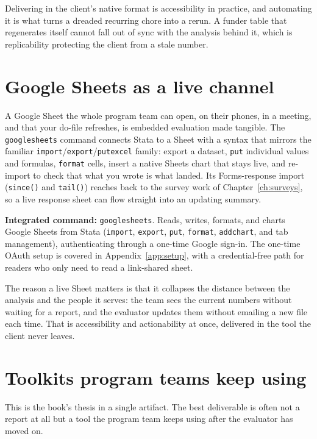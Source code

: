 \documentclass[
    a4paper,
    fontsize=10pt,
    twoside=true,
    numbers=noenddot,
]{kaobook}
\begin{document}
Delivering in the client's native format is accessibility in practice, and automating it is what turns a dreaded recurring chore into a rerun. A funder table that regenerates itself cannot fall out of sync with the analysis behind it, which is replicability protecting the client from a stale number.

\section{Google Sheets as a live channel}
A Google Sheet the whole program team can open, on their phones, in a meeting, and that your do-file refreshes, is embedded evaluation made tangible. The \texttt{googlesheets} command connects Stata to a Sheet with a syntax that mirrors the familiar \texttt{import}/\texttt{export}/\texttt{putexcel} family: export a dataset, \texttt{put} individual values and formulas, \texttt{format} cells, insert a native Sheets chart that stays live, and re-import to check that what you wrote is what landed. Its Forms-response import (\texttt{since()} and \texttt{tail()}) reaches back to the survey work of Chapter~\ref{ch:surveys}, so a live response sheet can flow straight into an updating summary.

\begin{kaobox}[frametitle=Package Integration: \texttt{googlesheets}]
\textbf{Integrated command:} \texttt{googlesheets}. Reads, writes, formats, and charts Google Sheets from Stata (\texttt{import}, \texttt{export}, \texttt{put}, \texttt{format}, \texttt{addchart}, and tab management), authenticating through a one-time Google sign-in. The one-time OAuth setup is covered in Appendix~\ref{app:setup}, with a credential-free path for readers who only need to read a link-shared sheet.
\end{kaobox}

The reason a live Sheet matters is that it collapses the distance between the analysis and the people it serves: the team sees the current numbers without waiting for a report, and the evaluator updates them without emailing a new file each time. That is accessibility and actionability at once, delivered in the tool the client never leaves.

\section{Toolkits program teams keep using}\label{sec:teamtoolkit}
This is the book's thesis in a single artifact. The best deliverable is often not a report at all but a tool the program team keeps using after the evaluator has moved on.
\end{document}
